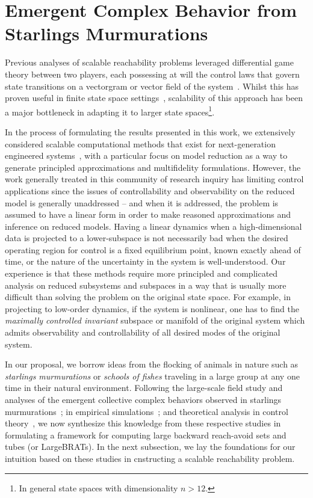 \section{Emergent Complex Behavior from Starlings Murmurations}
%
Previous analyses of scalable reachability problems leveraged differential game theory between two players, each possessing at will the control laws that govern state transitions on a vectorgram or vector field of the system~\cite{Mitchell2005, SylviaScalability}. Whilst this has proven useful in finite state space settings~\cite{Bajcsy, Bansal}, scalability of this approach has been a major bottleneck in adapting it to larger state spaces\footnote{In general state spaces with dimensionality $n>12$.}. 

In the process of formulating the results presented in this work, we extensively considered scalable computational methods that exist for next-generation engineered systems~\cite{LadevezeBook, Peherstorfer2016, QLMOR, McQuarrie2021, Nouy2010}, with a particular focus on model reduction as a way to generate principled approximations and multifidelity formulations. However, the work generally treated in this community of research inquiry has limiting control applications since the issues of controllability and observability on the reduced model is generally unaddressed -- and when it is addressed, the problem is assumed to have a linear form in order to make reasoned approximations and inference on reduced models. Having a linear dynamics when a high-dimensional data is projected to a lower-subspace is not necessarily bad when the desired operating region for control is a fixed equilibrium point, known exactly ahead of time, or the nature of the uncertainty in the system is well-understood. Our experience is that these methods require more principled and complicated analysis on reduced subsystems and subspaces in a way that is usually more difficult than solving the problem on the original state space. For example, in projecting to low-order dynamics, if the system is nonlinear, one has to find the \textit{maximally controlled invariant} subspace or manifold of the original system which admits observability and controllability of all desired modes of the original system. 

In our proposal, we borrow ideas from the flocking of animals in nature such as \textit{starlings murmurations} or \textit{schools of fishes} traveling in a large group at any one time in their natural environment. Following the large-scale field study and analyses of the emergent collective complex behaviors observed in starlings murmurations~\cite{Ballerini1232}; in empirical simulations~\cite{Vicsek1995novel}; and theoretical analysis in control theory~\cite{JadbabaieCoord}, we now synthesize this knowledge from these respective studies in formulating a framework for computing large backward reach-avoid sets and tubes (or LargeBRATs). In the next subsection, we lay the foundations for our intuition based on these studies in cnstructing a scalable reachability problem.

